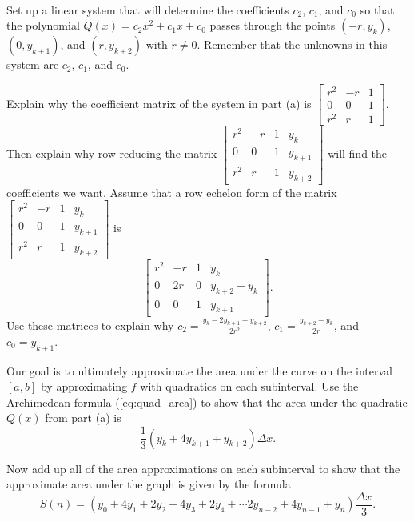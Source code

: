\begin{pactivity} ~
	\ba
	\item Set up a linear system that will determine the coefficients $c_2$, $c_1$,  and $c_0$ so that the polynomial $Q(x) = c_2x^2+c_1x+c_0$ passes through the points $(-r, y_k)$, $(0, y_{k+1})$,  and $(r, y_{k+2})$ with $r \neq 0$. Remember that the unknowns in this system are $c_2$, $c_1$, and $c_0$. 

	\item Explain why the coefficient matrix of the system in part (a) is $\left[ \begin{array}{crc} r^2&-r&1 \\ 0&0&1 \\ r^2&r&1 \end{array} \right]$. Then explain why row reducing the matrix $\left[ \begin{array}{crcc} r^2&-r&1&y_k \\ 0&0&1&y_{k+1} \\ r^2&r&1&y_{k+2} \end{array} \right]$ will find the coefficients we want. Assume that a row echelon form of the matrix $\left[ \begin{array}{crcc} r^2&-r&1&y_k \\ 0&0&1&y_{k+1} \\ r^2&r&1&y_{k+2} \end{array} \right]$ is 
\[\left[ \begin{array}{crcc} r^2&-r&1&y_k \\ 0&2r&0&y_{k+2}-y_k \\ 0&0&1&y_{k+1} \end{array} \right].\]
Use these matrices to explain why $c_2=\frac{y_k-2y_{k+1}+y_{k+2}}{2r^2}$, $c_1=\frac{y_{k+2}-y_k}{2r}$, and $c_0 = y_{k+1}$. 

	\item Our goal is to ultimately approximate the area under the curve on the interval $[a,b]$ by approximating $f$ with quadratics on each subinterval. Use the Archimedean formula (\ref{eq:quad_area}) to show that the area under the quadratic $Q(x)$ from part (a) is 
\[\frac{1}{3}  \left(y_k+4y_{k+1}+y_{k+2}\right) \Delta x.\]

	\item Now add up all of the area approximations on each subinterval to show that the approximate area under the graph is given by the formula 
\begin{equation} \label{eq:1_b_Simpson_sum} 
S(n) = \left(y_0 + 4y_1 + 2y_2 + 4y_3 + 2y_4 + \cdots 2y_{n-2} + 4y_{n-1} + y_n\right) \frac{\Delta x}{3}.
\end{equation}


	\ea
	
\end{pactivity}

